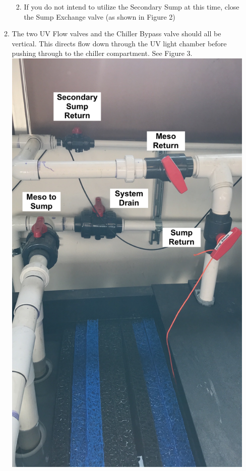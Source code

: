 \documentclass[]{book}
\providecommand{\tightlist}{%
  \setlength{\itemsep}{0pt}\setlength{\parskip}{0pt}}
\begin{document}
\begin{enumerate}
\begin{enumerate}
    \begin{enumerate}
    \def\labelenumiii{\arabic{enumiii}.}
    \tightlist
    \item
      If you do not intend to utilize the Secondary Sump at this time,
      close the Sump Exchange valve (as shown in Figure 2)
    \end{enumerate}
  \item
    The two UV Flow valves and the Chiller Bypass valve should all be
    vertical. This directs flow down through the UV light chamber before
    pushing through to the chiller compartment. See Figure 3.\\
    \includegraphics{images/Sump_Flow_Valves.png}\\

\end{enumerate}
\end{enumerate}
\end{document}
